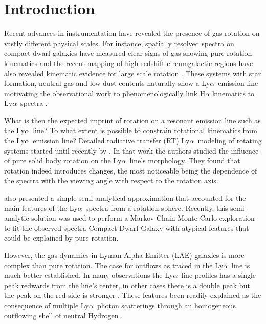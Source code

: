 \documentclass[a4paper,fleqn,usenatbib]{mnras}
\newcommand{\lya}{\ifmmode{{\rm Ly}\alpha}\else Ly$\alpha$\ \fi}
\begin{document}


\section{Introduction}
\label{sec:intro}

Recent advances in instrumentation have revealed the presence of gas
rotation on vastly different physical scales.
For instance, spatially resolved spectra on compact dwarf galaxies
have measured clear signs of gas showing pure rotation kinematics
\citep{2015A&A...577A..21C,2017A&A...600A.125C} and the recent mapping of
high redshift circumgalactic regions have also revealed kinematic
evidence for large scale rotation \citep{2018MNRAS.473.3907A}.
These systems with star formation, neutral gas and low dust
contents naturally show a \lya emission line \citep{PartridgePeebles}
motivating the observational work to phenomenologically link
H$\alpha$ kinematics to \lya spectra \citep[e.g.][]{Herenz2016}. 


What is then the expected imprint of rotation on a resonant emission
line such as the \lya line? To what extent is possible to constrain
rotational kinematics from the \lya emission line? 
Detailed radiative transfer (RT) \lya modeling of rotating systems
started until recently by \cite{Garavito14}.
In that work the authors studied the influence of pure solid body
rotation on the \lya line's morphology.
They found that rotation indeed introduces changes, the most
noticeable being the dependence of the spectra with the viewing
angle with respect to the rotation axis. 

\cite{Garavito14} also presented a simple semi-analytical
approximation that accounted for the main features of the \lya spectra
from a rotation sphere.
Recently, this semi-analytic solution was used to perform a Markov
Chain Monte Carlo exploration to fit the observed spectra Compact
Dwarf Galaxy \citep{tololo} with atypical features that could be
explained by pure rotation.  

However, the gas dynamics in Lyman Alpha Emitter (LAE) galaxies is
more complex than pure rotation.
The case for outflows as traced in the \lya line is much better
established.
In many observations the \lya line profiles has a single peak
redwards from the line's center, in other cases there is a double peak
but the peak on the red side is stronger
\citep[e.g.][]{2010ApJ...717..289S,Erb14,Trainor16}.   
These features been readily explained as the consequence of multiple
\lya photon scatterings through an homogeneous outflowing shell of
neutral Hydrogen
\citep{2006A&A...460..397V,Orsi12,2012ApJ...751...29Y,2015ApJ...812..123G}.  
\end{document}
